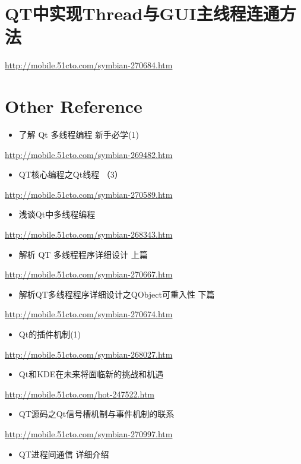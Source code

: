 \documentclass[9pt,b5paper]{article}
\begin{document}
\section{QT中实现Thread与GUI主线程连通方法}
\label{sec-6}
\url{http://mobile.51cto.com/symbian-270684.htm}
\subsection{}
\label{sec-6-1}

\section{Other Reference}
\label{sec-7}
\begin{itemize}
\item 了解 Qt 多线程编程 新手必学(1)
\end{itemize}
\url{http://mobile.51cto.com/symbian-269482.htm}
\begin{itemize}
\item QT核心编程之Qt线程 （3）
\end{itemize}
\url{http://mobile.51cto.com/symbian-270589.htm}
\begin{itemize}
\item 浅谈Qt中多线程编程
\end{itemize}
\url{http://mobile.51cto.com/symbian-268343.htm}
\begin{itemize}
\item 解析 QT 多线程程序详细设计 上篇
\end{itemize}
\url{http://mobile.51cto.com/symbian-270667.htm}
\begin{itemize}
\item 解析QT多线程程序详细设计之QObject可重入性 下篇
\end{itemize}
\url{http://mobile.51cto.com/symbian-270674.htm}
\begin{itemize}
\item Qt的插件机制(1)
\end{itemize}
\url{http://mobile.51cto.com/symbian-268027.htm}
\begin{itemize}
\item Qt和KDE在未来将面临新的挑战和机遇
\end{itemize}
\url{http://mobile.51cto.com/hot-247522.htm}
\begin{itemize}
\item QT源码之Qt信号槽机制与事件机制的联系
\end{itemize}
\url{http://mobile.51cto.com/symbian-270997.htm}
\begin{itemize}
\item QT进程间通信 详细介绍
\end{itemize}
\end{document}
